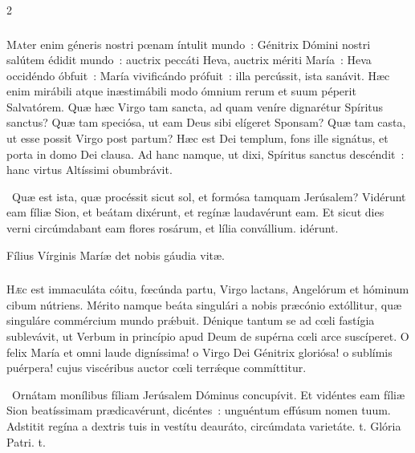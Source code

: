 \documentclass[9pt,twoside]{extarticle}
\begin{document}
\begin{multicols}{2}
{{\subsubsection*{\center {}}
\lettrine{M}ater enim géneris nostri pœnam íntulit mundo~: Génitrix Dómini nostri salútem édidit mundo~: auctrix peccáti Heva, auctrix mériti María~: Heva occidéndo óbfuit~: María vivificándo prófuit~: illa percússit, ista sanávit. Hæc enim mirábili atque inæstimábili modo ómnium rerum et suum péperit Salvatórem. Quæ hæc Virgo tam sancta, ad quam veníre dignarétur Spíritus sanctus? Quæ tam speciósa, ut eam Deus sibi elígeret Sponsam? Quæ tam casta, ut esse possit Virgo post partum? Hæc est Dei templum, fons ille signátus, et porta in domo Dei clausa. Ad hanc namque, ut dixi, Spíritus sanctus descéndit~: hanc virtus Altíssimi obumbrávit.

\begin{tightlist}{}
\item {}~Quæ est ista, quæ procéssit sicut sol, et formósa tamquam Jerúsalem? \textred{*} Vidérunt eam fíliæ Sion, et beátam dixérunt, et regínæ laudavérunt eam.
 Et sicut dies verni circúmdabant eam flores rosárum, et lília convállium. idérunt.
\item {\small {} Fílius Vírginis Maríæ det nobis gáudia vitæ.}
\end{tightlist}

\subsubsection*{\center {}}
\lettrine{H}æc est immaculáta cóitu, fœcúnda partu, Virgo lactans, Angelórum et hóminum cibum nútriens. Mérito namque beáta singulári a nobis præcónio extóllitur, quæ singuláre commércium mundo prǽbuit. Dénique tantum se ad cœli fastígia sublevávit, ut Verbum in princípio apud Deum de supérna cœli arce suscíperet. O felix María et omni laude digníssima! o Virgo Dei Génitrix gloriósa! o sublímis puérpera! cujus viscéribus auctor cœli terrǽque commíttitur.

\begin{tightlist}{}
\item {}~Ornátam monílibus fíliam Jerúsalem Dóminus concupívit. \textred{*} Et vidéntes eam fíliæ Sion beatíssimam prædicavérunt, dicéntes~: unguéntum effúsum nomen tuum.
 Adstitit regína a dextris tuis in vestítu deauráto, circúmdata varietáte. t. Glória Patri. t.
\end{tightlist}

}}
\end{multicols}
\end{document}

